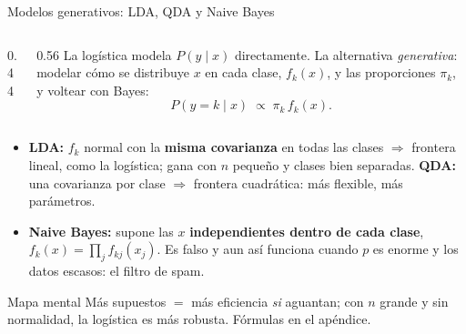 \documentclass{beamer}
\newcommand{\1}{\mathbb{I}}
\begin{document}
\begin{frame}{Modelos generativos: LDA, QDA y Naive Bayes}
\small
\begin{columns}[T]
\begin{column}{0.44\textwidth}
\begin{center}
\end{center}
\end{column}
\begin{column}{0.56\textwidth}
\vspace{0.05cm}
La logística modela $P(y \mid x)$ directamente. La alternativa \emph{generativa}: modelar cómo se distribuye $x$ en cada clase, $f_k(x)$, y las proporciones $\pi_k$, y voltear con Bayes:
\[ P(y = k \mid x) \;\propto\; \pi_k \, f_k(x). \]
\end{column}
\end{columns}
\pause
\begin{itemize}\itemsep2pt
  \item \textbf{LDA:} $f_k$ normal con la \textbf{misma covarianza} en todas las clases $\Rightarrow$ frontera lineal, como la logística; gana con $n$ pequeño y clases bien separadas. \textbf{QDA:} una covarianza por clase $\Rightarrow$ frontera cuadrática: más flexible, más parámetros.
  \item \textbf{Naive Bayes:} supone las $x$ \textbf{independientes dentro de cada clase}, $f_k(x) = \prod_j f_{kj}(x_j)$. Es falso y aun así funciona cuando $p$ es enorme y los datos escasos: el filtro de spam. \pause
\end{itemize}
\begin{block}{Mapa mental}
Más supuestos $=$ más eficiencia \emph{si} aguantan; con $n$ grande y sin normalidad, la logística es más robusta. Fórmulas en el apéndice.
\end{block}
\end{frame}
\end{document}

